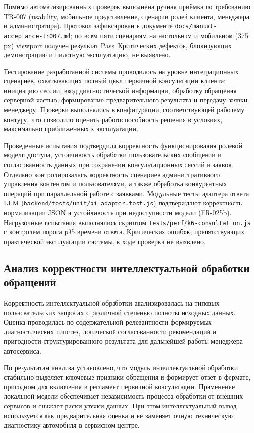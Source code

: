 \documentclass[14pt,a4paper]{extarticle}
\numberwithin{figure}{section}
\numberwithin{table}{section}
\begin{document}
Помимо автоматизированных проверок выполнена ручная приёмка по требованию
TR-007 (usability, мобильное представление, сценарии ролей клиента, менеджера
и администратора). Протокол зафиксирован в документе
\texttt{docs/manual-acceptance-tr007.md}; по всем пяти сценариям на
настольном и мобильном (375\,px) viewport получен результат Pass.
Критических дефектов, блокирующих демонстрацию и пилотную эксплуатацию,
не выявлено.

Тестирование разработанной системы проводилось на уровне интеграционных
сценариев, охватывающих полный цикл первичной консультации клиента:
инициацию сессии, ввод диагностической информации, обработку обращения
серверной частью, формирование предварительного результата и передачу
заявки менеджеру. Проверки выполнялись в конфигурации, соответствующей
рабочему контуру, что позволило оценить работоспособность решения в
условиях, максимально приближенных к эксплуатации.

Проведенные испытания подтвердили корректность функционирования ролевой
модели доступа, устойчивость обработки пользовательских сообщений и
согласованность данных при сохранении консультационных сессий и заявок.
Отдельно контролировалась корректность сценариев административного
управления контентом и пользователями, а также обработка конкурентных
операций при параллельной работе с заявками. Модульные тесты адаптера
ответа LLM (\texttt{backend/tests/unit/ai-adapter.test.js}) подтверждают
корректность нормализации JSON и устойчивость при недоступности модели
(FR-025b). Нагрузочные испытания выполнялись скриптом
\texttt{tests/perf/k6-consultation.js} с контролем порога p95 времени
ответа. Критических ошибок, препятствующих практической эксплуатации
системы, в ходе проверки не выявлено.

\subsection{Анализ корректности интеллектуальной обработки
обращений}\label{sec:chapter3-ai}

Корректность интеллектуальной обработки анализировалась на типовых
пользовательских запросах с различной степенью полноты исходных данных.
Оценка проводилась по содержательной релевантности формируемых
диагностических гипотез, логической согласованности рекомендаций и
пригодности структурированного результата для дальнейшей работы менеджера
автосервиса.

По результатам анализа установлено, что модуль интеллектуальной обработки
стабильно выделяет ключевые признаки обращения и формирует ответ в
формате, пригодном для включения в регламент первичной консультации.
Применение локальной модели обеспечивает независимость процесса обработки
от внешних сервисов и снижает риски утечки данных. При этом
интеллектуальный вывод используется как предварительная оценка и не
заменяет очную техническую диагностику автомобиля в сервисном центре.
\end{document}
